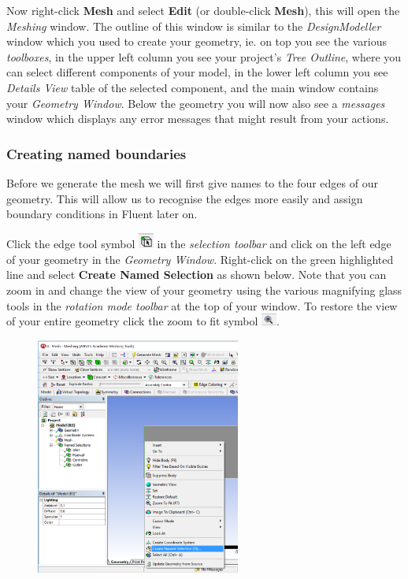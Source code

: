\documentclass[11pt,a4paper,oneside]{scrartcl}
\newcommand\bfr[1]{\textcolor[rgb]{1,0.00,0.00}{\textbf{\textsf{#1}}}}
\begin{document}
Now right-click \bfr{Mesh} and select \bfr{Edit} (or double-click \bfr{Mesh}), this will open the \emph{Meshing} window. The outline of this window is similar to the \emph{DesignModeller} window which you used to create your geometry, ie. on top you see the various \emph{toolboxes}, in the upper left column you see your project's \emph{Tree Outline}, where you can select different components of your model, in the lower left column you see \emph{Details View} table of the selected component, and the main window contains your \emph{Geometry Window}. Below the geometry you will now also see a \emph{messages} window which displays any error messages that might result from your actions.

\subsubsection{Creating named boundaries}

Before we generate the mesh we will first give names to the four edges of our geometry. This will allow us to recognise the edges more easily and assign boundary conditions in Fluent later on.

Click the edge tool symbol \includegraphics[width=0.5cm]{edge_tool.png} in the \emph{selection toolbar} and click on the left edge of your geometry in the \emph{Geometry Window}. Right-click on the green highlighted line and select \bfr{Create Named Selection} as shown below. Note that you can zoom in and change the view of your geometry using the various magnifying glass tools in the \emph{rotation mode toolbar} at the top of your window. To restore the view of your entire geometry click the zoom to fit symbol \includegraphics[width=0.5cm]{zoom_to_fit.png}.

\begin{figure}[H]
\begin{center}
\includegraphics[width=0.6\textwidth,clip]{create_named_selection.png}
\end{center}
\end{figure}
\end{document}
